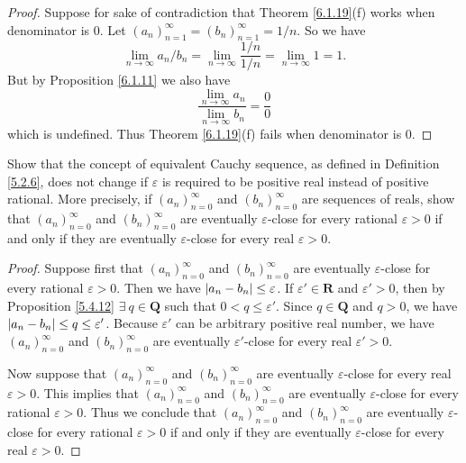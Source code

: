 \begin{proof}
    Suppose for sake of contradiction that Theorem \ref{6.1.19}(f) works when denominator is \(0\).
    Let \((a_n)_{n = 1}^\infty = (b_n)_{n = 1}^\infty = 1 / n\).
    So we have
    \[
        \lim_{n \to \infty} a_n / b_n = \lim_{n \to \infty} \frac{1 / n}{1 / n} = \lim_{n \to \infty} 1 = 1.
    \]
    But by Proposition \ref{6.1.11} we also have
    \[
        \frac{\lim_{n \to \infty} a_n}{\lim_{n \to \infty} b_n} = \frac{0}{0}
    \]
    which is undefined.
    Thus Theorem \ref{6.1.19}(f) fails when denominator is \(0\).
\end{proof}

\begin{exercise}\label{ex 6.1.10}
    Show that the concept of equivalent Cauchy sequence, as defined in Definition \ref{5.2.6}, does not change if \(\varepsilon\) is required to be positive real instead of positive rational.
    More precisely, if \((a_n)_{n = 0}^\infty\) and \((b_n)_{n = 0}^\infty\) are sequences of reals, show that \((a_n)_{n = 0}^\infty\) and \((b_n)_{n = 0}^\infty\) are eventually \(\varepsilon\)-close for every rational \(\varepsilon > 0\) if and only if they are eventually \(\varepsilon\)-close for every real \(\varepsilon > 0\).
\end{exercise}

\begin{proof}
    Suppose first that \((a_n)_{n = 0}^\infty\) and \((b_n)_{n = 0}^\infty\) are eventually \(\varepsilon\)-close for every rational \(\varepsilon > 0\).
    Then we have \(\abs*{a_n - b_n} \leq \varepsilon\).
    If \(\varepsilon' \in \mathbf{R}\) and \(\varepsilon' > 0\), then by Proposition \ref{5.4.12} \(\exists\ q \in \mathbf{Q}\) such that \(0 < q \leq \varepsilon'\).
    Since \(q \in \mathbf{Q}\) and \(q > 0\), we have \(\abs*{a_n - b_n} \leq q \leq \varepsilon'\).
    Because \(\varepsilon'\) can be arbitrary positive real number, we have \((a_n)_{n = 0}^\infty\) and \((b_n)_{n = 0}^\infty\) are eventually \(\varepsilon'\)-close for every real \(\varepsilon' > 0\).

    Now suppose that \((a_n)_{n = 0}^\infty\) and \((b_n)_{n = 0}^\infty\) are eventually \(\varepsilon\)-close for every real \(\varepsilon > 0\).
    This implies that \((a_n)_{n = 0}^\infty\) and \((b_n)_{n = 0}^\infty\) are eventually \(\varepsilon\)-close for every rational \(\varepsilon > 0\).
    Thus we conclude that \((a_n)_{n = 0}^\infty\) and \((b_n)_{n = 0}^\infty\) are eventually \(\varepsilon\)-close for every rational \(\varepsilon > 0\) if and only if they are eventually \(\varepsilon\)-close for every real \(\varepsilon > 0\).
\end{proof}